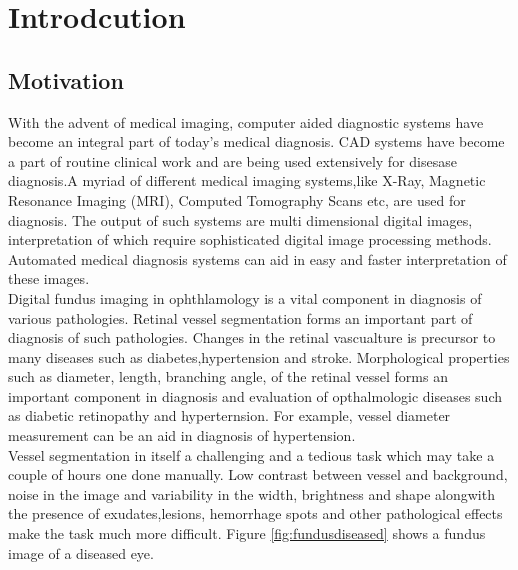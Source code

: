 
\chapter{Introdcution}  %

\ifpdf
    \graphicspath{{Chapter1/Figs/Raster/}{Chapter1/Figs/PDF/}{Chapter1/Figs/}}
\else
    \graphicspath{{Chapter1/Figs/Vector/}{Chapter1/Figs/}}
\fi


\section{Motivation}
With the advent of medical imaging, computer aided diagnostic systems have become an integral part of today's medical diagnosis\cite{doi2007computer}. CAD systems have become a part of routine clinical work and are being used extensively for disesase diagnosis.A myriad of different medical imaging systems,like X-Ray, Magnetic Resonance Imaging (MRI), Computed Tomography Scans etc, are used for diagnosis. The output of such systems are multi dimensional digital images, interpretation of which require sophisticated digital image processing methods. Automated medical diagnosis systems can aid in easy and faster interpretation of these images.\\	

Digital fundus imaging in ophthlamology is a vital component in diagnosis of various pathologies. Retinal vessel segmentation forms an important part of diagnosis of such pathologies. Changes in the retinal vascualture is precursor to many diseases such as diabetes,hypertension and stroke. Morphological properties such as diameter, length, branching angle, of the retinal vessel forms an important component in diagnosis and evaluation of opthalmologic diseases such as diabetic retinopathy \cite{sinthanayothin2002automated} and hyperternsion. For example, vessel diameter measurement can be an aid in diagnosis of hypertension\cite{calvo2011automatic}.\\

Vessel segmentation in itself a challenging and a tedious task which may take a couple of hours one done manually. Low contrast between vessel and background, noise in the image and variability in the width, brightness and shape alongwith the presence of exudates,lesions, hemorrhage spots and other pathological effects make the task much more difficult. Figure \ref{fig:fundusdiseased} shows a fundus image of a diseased eye.\\

